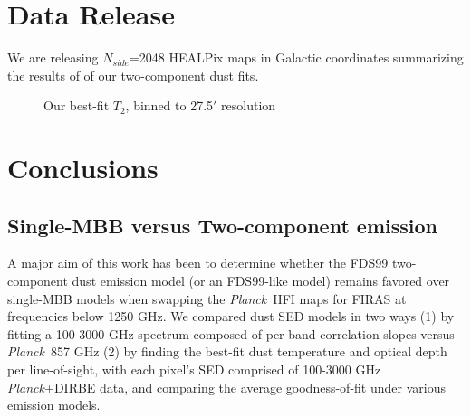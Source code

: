 \documentclass{emulateapj}
\newcommand{\PLANCK}{{\it Planck}}
\begin{document}
\section{Data Release}
\label{sec:release}
We are releasing $N_{side}$=2048 HEALPix maps in Galactic coordinates 
summarizing the results of of our two-component dust fits.




\begin{figure*} [ht]
\begin{center}
\caption{\label{fig:results} Our best-fit $T_2$, binned to 27.5$'$ resolution}
\end{center}
\end{figure*}

\section{Conclusions}
\label{sec:conclusion}

\subsection{Single-MBB versus Two-component emission}
A major aim of this work has been to determine whether the  FDS99 
two-component dust emission model (or an FDS99-like model) remains favored over
single-MBB models when swapping the \PLANCK~HFI maps for FIRAS at frequencies 
below 1250 GHz. We compared dust SED models in two ways (1) by fitting a 
100-3000 GHz spectrum composed of per-band correlation slopes versus 
\PLANCK~857 GHz (2) by finding the best-fit dust temperature and optical depth
per line-of-sight, with each pixel's SED comprised of 100-3000 GHz 
\PLANCK+DIRBE data, and comparing the average goodness-of-fit under various
emission models.
\end{document}
